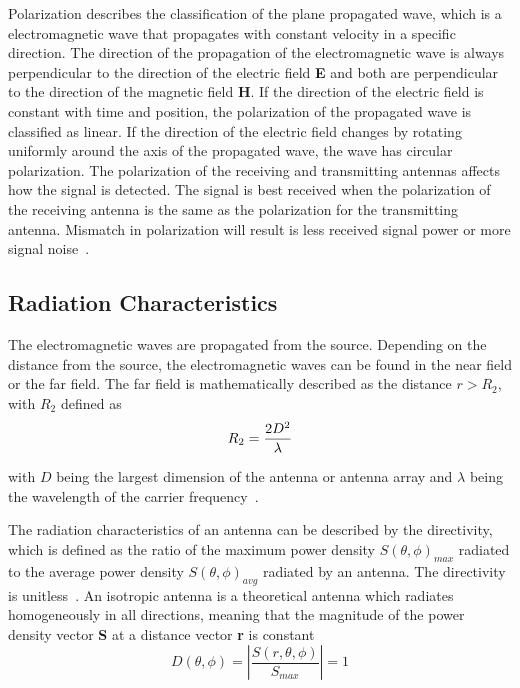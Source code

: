 Polarization describes the classification of the plane propagated wave, which is a electromagnetic wave that propagates with constant velocity in a specific direction. The direction of the propagation of the electromagnetic wave is always perpendicular to the direction of the electric field \textbf{E} and both are perpendicular to the direction of the magnetic field \textbf{H}. If the direction of the electric field is constant with time and position, the polarization of the propagated wave is classified as linear. If the direction of the electric field changes by rotating uniformly around the axis of the propagated wave, the wave has circular polarization. The polarization of the receiving and transmitting antennas affects how the signal is detected. The signal is best received when the polarization of the receiving antenna is the same as the polarization for the transmitting antenna. Mismatch in polarization will result is less received signal power or more signal noise~\cite[p. 82-84]{direct_energy}. 

\subsection{Radiation Characteristics} \label{ss:rad_char}
The electromagnetic waves are propagated from the source. Depending on the distance from the source, the electromagnetic waves can be found in the near field or the far field. The far field is mathematically described as the distance $r>R_2$, with $R_2$ defined as
\begin{equation} \label{eq:far_field}
    R_2 = \frac{2 D^2}{\lambda}
    \tagaddtext{[\si{\meter}]}
\end{equation}

with $D$ being the largest dimension of the antenna or antenna array and $\lambda$ being the wavelength of the carrier frequency~\cite[p. 4]{ant_beam_form}.

The radiation characteristics of an antenna can be described by the directivity, which is defined as the ratio of the maximum power density $S\left( \theta, \phi \right)_{max}$ radiated to the average power density $S\left( \theta, \phi \right)_{avg}$ radiated by an antenna. The directivity is unitless~\cite[p. 63]{direct_energy}. An isotropic antenna is a theoretical antenna which radiates homogeneously in all directions, meaning that the magnitude of the power density vector \textbf{S} at a distance vector \textbf{r} is constant
\begin{equation} \label{eq:isotropic_radiation}
    D\left( \theta, \phi \right) = \left| \frac{S \left(r, \theta, \phi \right)}{S_{max}} \right|=1
\end{equation}

